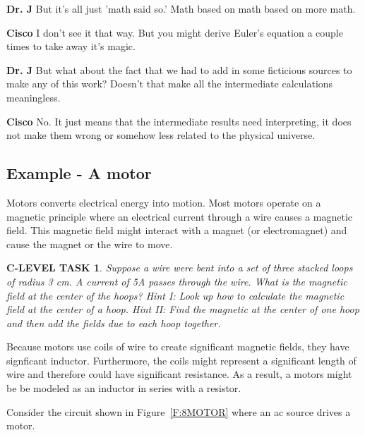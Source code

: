 \documentclass{book}
\numberwithin{equation}{section}
\newtheorem{clevel}{C-LEVEL TASK}
\theoremstyle{definition}
\begin{document}
\setlength{\hangindent}{30pt}\noindent \textbf{Dr. J}
But it's all just 'math said so.' Math based on math based on more math.

\setlength{\hangindent}{30pt}\noindent \textbf{Cisco}
I don't see it that way. But you might derive Euler's equation a couple times to take away it's magic. 

\setlength{\hangindent}{30pt}\noindent \textbf{Dr. J}
But what about the fact that we had to add in some ficticious sources to make any of this work? Doesn't that make all the intermediate calculations meaningless.

\setlength{\hangindent}{30pt}\noindent \textbf{Cisco}
No. It just means that the intermediate results need interpreting, it does not make them wrong or somehow less related to the physical universe.

\subsection{Example - A motor}
Motors converts electrical energy into motion. Most motors operate on a magnetic principle where an electrical current through a wire causes a magnetic field. This magnetic field might interact with a magnet (or electromagnet) and cause the magnet or the wire to move. 

\begin{clevel}
Suppose a wire were bent into a set of three stacked loops of radius 3 cm. A current of 5A passes through the wire. What is the magnetic field at the center of the hoops? Hint I: Look up how to calculate the magnetic field at the center of a hoop. Hint II: Find the magnetic at the center of one hoop and then add the fields due to each hoop together.
\end{clevel}

Because motors use coils of wire to create significant magnetic fields, they have signficant inductor. Furthermore, the coils might represent a significant length of wire and therefore could have significant resistance. As a result, a motors might be be modeled as an inductor in series with a resistor.\par

Consider the circuit shown in Figure~\ref{F:8MOTOR} where an ac source drives a motor.
\end{document}
